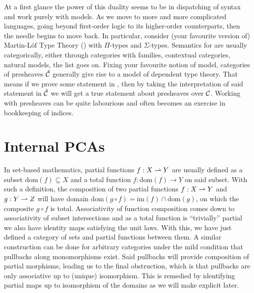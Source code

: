 \documentclass[12pt]{article}
\begin{document}
At a first glance the power of this duality seems to be in dispatching of syntax
and work purely with models. As we move to more and more complicated languages,
going beyond first-order logic to its higher-order counterparts, then the needle
begins to move back. In particular, consider (your favourite version of)
Martin-L\"of Type Theory (\MLTT{}) with \(\Pi\)-types and \(\Sigma\)-types.
Semantics for \MLTT{} are usually categorically, either through categories with
families, contextual categories, natural models, the list goes on. Fixing your
favourite notion of model, categories of presheaves \(\hat{\mathcal{C}}\) generally
give rise to a model of dependent type theory. That means if we prove some
statement in \MLTT{}, then by taking the interpretation of said statement in
\(\hat{\mathcal{C}}\) we will get a true statement about presheaves over \(\mathcal{C}\).
Working with presheaves can be quite labourious and often becomes an exercise
in bookkeeping of indices.



\newpage
\section{Internal PCAs}

In set-based mathematics, partial functions \(f : X \rightharpoonup Y\) are usually
defined as a subset \(\text{dom}(f) \subseteq X\) and a total function
\(f : \text{dom}(f) \to Y\) on said subset. With such a definition, the
composition of two partial functions \(f : X \rightharpoonup Y\) and \(g : Y \rightharpoonup Z\)
will have domain \(\text{dom}(g \circ f) = \text{im}(f) \cap \text{dom}(g)\), on
which the composite \(g \circ f\) is total. Associativity of function
composition comes down to associativity of subset intersections and as a total
function is ``trivially'' partial we also have identity maps satisfying the unit
laws. With this, we have just defined a category of sets and partial functions
between them. A similar construction can be done for arbitrary categories under
the mild condition that pullbacks along monomorphisms exist. Said pullbacks will
provide composition of partial morphisms, leading us to the final obstruction,
which is that pullbacks are only associative up to (unique) isomorphism. This is
remedied by identifying partial maps up to isomorphism of the domains as we will
make explicit later.
\end{document}
